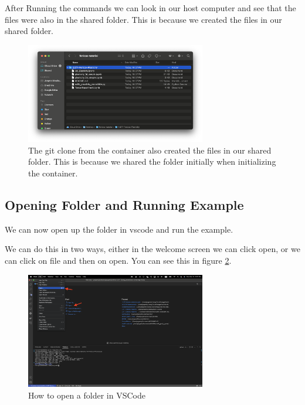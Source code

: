 \documentclass[final]{article}
\numberwithin{equation}{section}
\theoremstyle{remarkStyle}
\begin{document}
After Running the commands we can look in our host computer and see that the files were also in the shared folder.
This is because we created the files in our shared folder.

\begin{figure}[H]
  \centering
  \includegraphics[width=0.7\textwidth]{Files-After-Git-clone.png}
  \caption{The git clone from the container also created the files in our shared folder. This is because we shared the folder initially when initializing the container.}%
  \label{fig:shared_files}%
\end{figure}

\subsection{Opening Folder and Running Example}

We can now open up the folder in vscode and run the example.

We can do this in two ways, either in the welcome screen we can click open, or we can click on file and then on open.
You can see this in figure \ref{fig:vsDocker-Open-Folder}.
\begin{figure}[H]
  \centering
  \includegraphics[width=0.7\textwidth]{Open-File.png}
  \caption{How to open a folder in VSCode }%
  \label{fig:vsDocker-Open-Folder}%
\end{figure}
\end{document}
